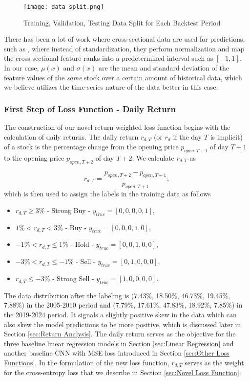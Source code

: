 \documentclass[preprint,12pt,numafflabel,authoryear]{elsarticle}
\begin{document}
\begin{figure}[htp]
\centering
\texttt{[image: data\_split.png]}
\caption{Training, Validation, Testing Data Split for Each Backtest Period}
\label{fig:data split}
\end{figure}

There has been a lot of work where cross-sectional data are used for predictions, such as \citet{gu2020empirical}, where instead of standardization, they perform normalization and map the cross-sectional feature ranks into a predetermined interval such as $[-1, 1]$. In our case, $\mu(x)$ and $\sigma(x)$ are the mean and standard deviation of the feature values of the \textit{same} stock over a certain amount of historical data, which we believe utilizes the time-series nature of the data better in this case.

\subsubsection{First Step of Loss Function - Daily Return}
\label{sec:First Step of Objective Function - Daily Return}

The construction of our novel return-weighted loss function begins with the calculation of daily returns. The daily return $r_{d, T}$ (or $r_d$ if the day $T$ is implicit) of a stock is the percentage change from the opening price $p_{open, T+1}$ of day $T+1$ to the opening price $p_{open, T+2}$ of day $T+2$. We calculate $r_{d,T}$ as 

\begin{equation}
\label{eq:daily return}
r_{d, T} = \frac{p_{open, T+2} - p_{open, T+1}}{p_{open, T+1}},
\end{equation}
which is then used to assign the labels in the training data as follows
\begin{itemize}
\item $r_{d,T} \geq 3\%$ - Strong Buy - $y_{true} = [0,0,0,0,1]$,
\item $1\% < r_{d,T} < 3\%$ - Buy - $y_{true} =[0,0,0,1,0]$,
\item $-1\% < r_{d,T} \leq 1\%$ - Hold - $y_{true} =[0,0,1,0,0]$,
\item $-3\% < r_{d,T} \leq -1\%$ - Sell - $y_{true} = [0,1,0,0,0]$,
\item $r_{d,T} \leq -3\%$ - Strong Sell - $y_{true} = [1,0,0,0,0]$.
\end{itemize}

The data distribution after the labeling is (7.43\%, 18.50\%, 46.73\%, 19.45\%, 7.88\%) in the 2005-2010 period and (7.79\%, 17.61\%, 47.83\%, 18.92\%, 7.85\%) in the 2019-2024 period. It signals a slightly positive skew in the data which can also skew the model predictions to be more positive, which is discussed later in Section \ref{sec:Return Analysis}. The daily return serves as the objective for the three baseline linear regression models in Section \ref{sec:Linear Regression} and another baseline CNN with MSE loss introduced in Section \ref{sec:Other Loss Functions}. In the formulation of the new loss function, $r_{d,T}$ serves as the weight for the cross-entropy loss that we describe in Section \ref{sec:Novel Loss Function}.
\end{document}
